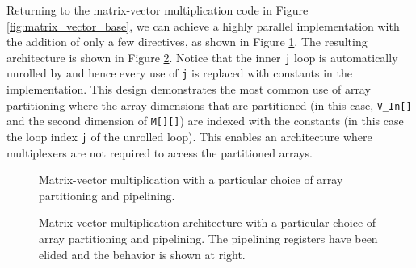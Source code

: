 
Returning to the matrix-vector multiplication code in Figure \ref{fig:matrix_vector_base}, we can achieve a highly parallel implementation with the addition of only a few directives, as shown in Figure \ref{fig:matrix_vector_optimized}.  The resulting architecture is shown in Figure \ref{fig:matrix_vector_optimized_behavior}.  Notice that the inner \lstinline|j| loop is automatically unrolled by \VHLS and hence every use of \lstinline|j| is replaced with constants in the implementation.   This design demonstrates the most common use of array partitioning where the array dimensions that are partitioned (in this case, \lstinline|V_In[]| and the second dimension of \lstinline|M[][]|) are indexed with the constants (in this case the loop index \lstinline|j| of the unrolled loop).  This enables an architecture where multiplexers are not required to access the partitioned arrays.

\begin{figure}
\begin{footnotesize}

\end{footnotesize}
\caption{Matrix-vector multiplication with a particular choice of array partitioning and pipelining. }
\label{fig:matrix_vector_optimized}
\end{figure}

\begin{figure}
\begin{tiny}

\end{tiny}
\caption{Matrix-vector multiplication architecture with a particular choice of array partitioning and pipelining.  The pipelining registers have been elided and the behavior is shown at right.}
\label{fig:matrix_vector_optimized_behavior}
\end{figure}

